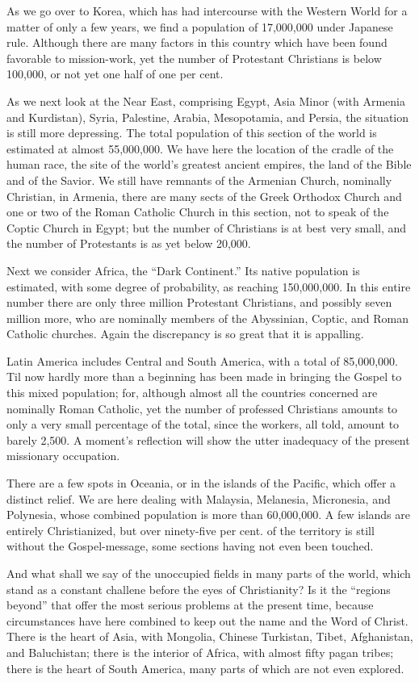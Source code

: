 \documentclass[
]{book}
\begin{document}
As we go over to Korea, which has had intercourse with the Western World for a matter of only a few years, we find a population of 17,000,000 under Japanese rule. Although there are many factors in this country which have been found favorable to mission-work, yet the number of Protestant Christians is below 100,000, or not yet one half of one per cent.

As we next look at the Near East, comprising Egypt, Asia Minor (with Armenia and Kurdistan), Syria, Palestine, Arabia, Mesopotamia, and Persia, the situation is still more depressing. The total population of this section of the world is estimated at almost 55,000,000. We have here the location of the cradle of the human race, the site of the world's greatest ancient empires, the land of the Bible and of the Savior. We still have remnants of the Armenian Church, nominally Christian, in Armenia, there are many sects of the Greek Orthodox Church and one or two of the Roman Catholic Church in this section, not to speak of the Coptic Church in Egypt; but the number of Christians is at best very small, and the number of Protestants is as yet below 20,000.

Next we consider Africa, the ``Dark Continent.'' Its native population is estimated, with some degree of probability, as reaching 150,000,000. In this entire number there are only three million Protestant Christians, and possibly seven million more, who are nominally members of the Abyssinian, Coptic, and Roman Catholic churches. Again the discrepancy is so great that it is appalling.

Latin America includes Central and South America, with a total of 85,000,000. Til now hardly more than a beginning has been made in bringing the Gospel to this mixed population; for, although almost all the countries concerned are nominally Roman Catholic, yet the number of professed Christians amounts to only a very small percentage of the total, since the workers, all told, amount to barely 2,500. A moment's reflection will show the utter inadequacy of the present missionary occupation.

There are a few spots in Oceania, or in the islands of the Pacific, which offer a distinct relief. We are here dealing with Malaysia, Melanesia, Micronesia, and Polynesia, whose combined population is more than 60,000,000. A few islands are entirely Christianized, but over ninety-five per cent. of the territory is still without the Gospel-message, some sections having not even been touched.

And what shall we say of the unoccupied fields in many parts of the world, which stand as a constant challene before the eyes of Christianity? Is it the ``regions beyond'' that offer the most serious problems at the present time, because circumstances have here combined to keep out the name and the Word of Christ. There is the heart of Asia, with Mongolia, Chinese Turkistan, Tibet, Afghanistan, and Baluchistan; there is the interior of Africa, with almost fifty pagan tribes; there is the heart of South America, many parts of which are not even explored.
\end{document}
